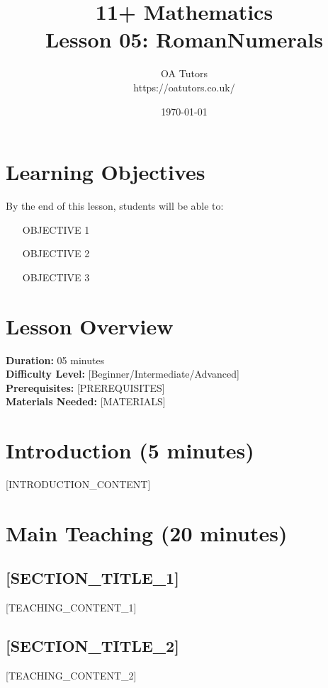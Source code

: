 \documentclass[a4paper,12pt]{article}
\begin{document}
\title{\textcolor{oablue}{\Huge 11+ Mathematics} \\ 
       \textcolor{oablue}{\Large Lesson 05: RomanNumerals}}
\author{\textcolor{oablue}{OA Tutors} \\ 
        \textcolor{oagray}{https://oatutors.co.uk/}}
\date{\textcolor{oagray}{\today}}

\maketitle

\section{Learning Objectives}
\begin{objective}
By the end of this lesson, students will be able to:
\begin{itemize}
    \item [OBJECTIVE 1]
    \item [OBJECTIVE 2] 
    \item [OBJECTIVE 3]
\end{itemize}
\end{objective}

\section{Lesson Overview}
\textbf{Duration:} 05 minutes \\
\textbf{Difficulty Level:} [Beginner/Intermediate/Advanced] \\
\textbf{Prerequisites:} [PREREQUISITES] \\
\textbf{Materials Needed:} [MATERIALS]

\section{Introduction (5 minutes)}
[INTRODUCTION_CONTENT]

\section{Main Teaching (20 minutes)}
\subsection{[SECTION_TITLE_1]}
[TEACHING_CONTENT_1]

\subsection{[SECTION_TITLE_2]}
[TEACHING_CONTENT_2]
\end{document}

